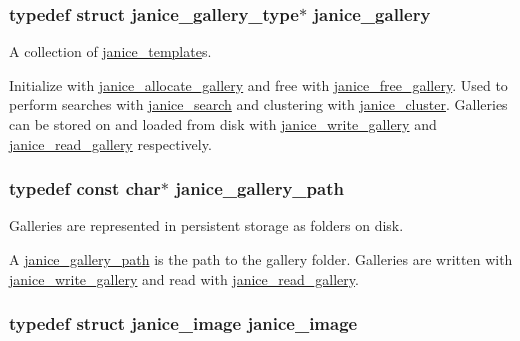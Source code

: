 \subsubsection[{janice\+\_\+gallery}]{\setlength{\rightskip}{0pt plus 5cm}typedef struct janice\+\_\+gallery\+\_\+type$\ast$ {\bf janice\+\_\+gallery}}\label{group__janice_ga08feff1c2835b44332afeda80c3d0fb7}


A collection of \hyperlink{group__janice_ga5593b06e86b90504968c0fc191ee2f3c}{janice\+\_\+template}s. 

Initialize with \hyperlink{group__janice_gad17bd59e58177b5f29f32f418ce77f71}{janice\+\_\+allocate\+\_\+gallery} and free with \hyperlink{group__janice_gad059b35e049028060025889a14fe6982}{janice\+\_\+free\+\_\+gallery}. Used to perform searches with \hyperlink{group__janice_ga073aa5f2133223c0b31ac3e78671836a}{janice\+\_\+search} and clustering with \hyperlink{group__janice_ga20d0206073850de0224651441c980ee7}{janice\+\_\+cluster}. Galleries can be stored on and loaded from disk with \hyperlink{group__janice_gaf6aa26be058ad0905d9a03d1798835be}{janice\+\_\+write\+\_\+gallery} and \hyperlink{group__janice_ga55130671c1d2a7fb607e96134d80da45}{janice\+\_\+read\+\_\+gallery} respectively. \hypertarget{group__janice_gac531556b0a1896b828209fe7fd843b90}{}
\subsubsection[{janice\+\_\+gallery\+\_\+path}]{\setlength{\rightskip}{0pt plus 5cm}typedef const char$\ast$ {\bf janice\+\_\+gallery\+\_\+path}}\label{group__janice_gac531556b0a1896b828209fe7fd843b90}


Galleries are represented in persistent storage as folders on disk. 

A \hyperlink{group__janice_gac531556b0a1896b828209fe7fd843b90}{janice\+\_\+gallery\+\_\+path} is the path to the gallery folder. Galleries are written with \hyperlink{group__janice_gaf6aa26be058ad0905d9a03d1798835be}{janice\+\_\+write\+\_\+gallery} and read with \hyperlink{group__janice_ga55130671c1d2a7fb607e96134d80da45}{janice\+\_\+read\+\_\+gallery}. \hypertarget{group__janice_ga3f20c208762563c88c414664c21d654e}{}
\subsubsection[{janice\+\_\+image}]{\setlength{\rightskip}{0pt plus 5cm}typedef struct {\bf janice\+\_\+image}  {\bf janice\+\_\+image}}\label{group__janice_ga3f20c208762563c88c414664c21d654e}


